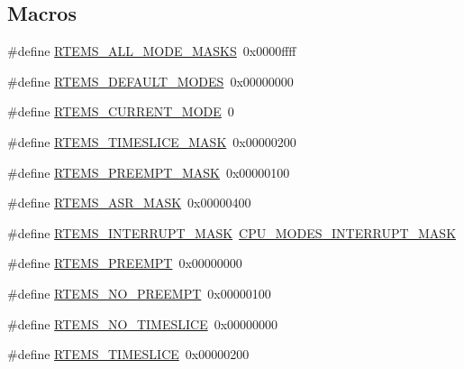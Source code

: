 \subsection*{Macros}
\begin{DoxyCompactItemize}
\item 
\#define \mbox{\hyperlink{group__ClassicModes_gaf0e90e4128790ead489a17c87d7e3971}{R\+T\+E\+M\+S\+\_\+\+A\+L\+L\+\_\+\+M\+O\+D\+E\+\_\+\+M\+A\+S\+KS}}~0x0000ffff
\item 
\#define \mbox{\hyperlink{group__ClassicModes_ga809c838116a3079c58fb6e41d7f1782a}{R\+T\+E\+M\+S\+\_\+\+D\+E\+F\+A\+U\+L\+T\+\_\+\+M\+O\+D\+ES}}~0x00000000
\item 
\#define \mbox{\hyperlink{group__ClassicModes_gae40f8f4f4340c9a36e09e6d2be93ff5a}{R\+T\+E\+M\+S\+\_\+\+C\+U\+R\+R\+E\+N\+T\+\_\+\+M\+O\+DE}}~0
\item 
\#define \mbox{\hyperlink{group__ClassicModes_gae1aa7190e76d1595155514e49dd86409}{R\+T\+E\+M\+S\+\_\+\+T\+I\+M\+E\+S\+L\+I\+C\+E\+\_\+\+M\+A\+SK}}~0x00000200
\item 
\#define \mbox{\hyperlink{group__ClassicModes_gadce57066cf804c77938d21a205c913ac}{R\+T\+E\+M\+S\+\_\+\+P\+R\+E\+E\+M\+P\+T\+\_\+\+M\+A\+SK}}~0x00000100
\item 
\#define \mbox{\hyperlink{group__ClassicModes_ga6280155241d23527a803204145c313d6}{R\+T\+E\+M\+S\+\_\+\+A\+S\+R\+\_\+\+M\+A\+SK}}~0x00000400
\item 
\#define \mbox{\hyperlink{group__ClassicModes_gaebcf8a52ba62835e741e5325a537a9af}{R\+T\+E\+M\+S\+\_\+\+I\+N\+T\+E\+R\+R\+U\+P\+T\+\_\+\+M\+A\+SK}}~\mbox{\hyperlink{sparc_2include_2rtems_2score_2cpu_8h_af8823e651e33b9683e0d89e5a8054ee6}{C\+P\+U\+\_\+\+M\+O\+D\+E\+S\+\_\+\+I\+N\+T\+E\+R\+R\+U\+P\+T\+\_\+\+M\+A\+SK}}
\item 
\#define \mbox{\hyperlink{group__ClassicModes_gaf10ca77d8ec042125324421ae1c307a9}{R\+T\+E\+M\+S\+\_\+\+P\+R\+E\+E\+M\+PT}}~0x00000000
\item 
\#define \mbox{\hyperlink{group__ClassicModes_gaabb8ccb34ba1b5c0497f370781630c88}{R\+T\+E\+M\+S\+\_\+\+N\+O\+\_\+\+P\+R\+E\+E\+M\+PT}}~0x00000100
\item 
\#define \mbox{\hyperlink{group__ClassicModes_ga140fecfdfeab8c819c7c7c20bd79f8ed}{R\+T\+E\+M\+S\+\_\+\+N\+O\+\_\+\+T\+I\+M\+E\+S\+L\+I\+CE}}~0x00000000
\item 
\#define \mbox{\hyperlink{group__ClassicModes_ga0559c65edac08e290536d0c211171a7e}{R\+T\+E\+M\+S\+\_\+\+T\+I\+M\+E\+S\+L\+I\+CE}}~0x00000200
\item 

\end{DoxyCompactItemize}
